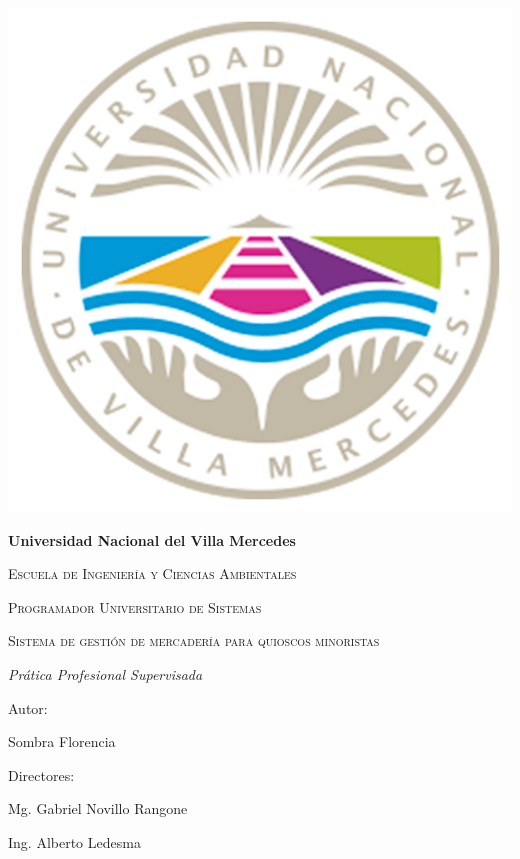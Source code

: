 \documentclass[twoside]{article}
\begin{document}
\begin{titlepage}
	\centering
    \includegraphics[scale=0.3]{escudo-unvime.png}\par
    \vspace{1cm}
    {\bfseries\LARGE Universidad Nacional del Villa Mercedes \par}
    \vspace{1cm}
    {\scshape Escuela de Ingeniería y Ciencias Ambientales \par}
    {\scshape\Large Programador Universitario de Sistemas \par}
    \vspace{2cm}
    {\scshape\Huge Sistema de gestión de mercadería para quioscos minoristas \par}
    \vspace{1cm}
    {\itshape\Large Prática Profesional Supervisada \par}
	\vfill
	{\Large Autor: \par}
	{\Large Sombra Florencia \par}
	\vfill	
	{\Large Directores: \par}
	{\Large Mg. Gabriel Novillo Rangone \par}
	{\Large Ing. Alberto Ledesma \par}
\end{titlepage}
\end{document}
